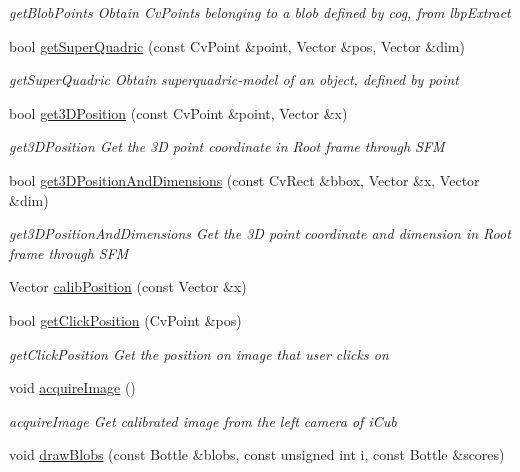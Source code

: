 \begin{DoxyCompactItemize}
\begin{DoxyCompactList}\small\item\em get\+Blob\+Points Obtain Cv\+Points belonging to a blob defined by cog, from lbp\+Extract \end{DoxyCompactList}\item 
bool \hyperlink{group__iol2opc_a6226f7de8cac860645608e45759f8d9a}{get\+Super\+Quadric} (const Cv\+Point \&point, Vector \&pos, Vector \&dim)
\begin{DoxyCompactList}\small\item\em get\+Super\+Quadric Obtain superquadric-\/model of an object, defined by point \end{DoxyCompactList}\item 
bool \hyperlink{group__iol2opc_af32fec2950ca87ee525c38168b02571b}{get3\+D\+Position} (const Cv\+Point \&point, Vector \&x)
\begin{DoxyCompactList}\small\item\em get3\+D\+Position Get the 3D point coordinate in Root frame through S\+FM \end{DoxyCompactList}\item 
bool \hyperlink{group__iol2opc_a6efd4c47885da925320b3d07deb5ec28}{get3\+D\+Position\+And\+Dimensions} (const Cv\+Rect \&bbox, Vector \&x, Vector \&dim)
\begin{DoxyCompactList}\small\item\em get3\+D\+Position\+And\+Dimensions Get the 3D point coordinate and dimension in Root frame through S\+FM \end{DoxyCompactList}\item 
Vector \hyperlink{group__iol2opc_a04b7cefdcd8c2ea856d348af2c07cb12}{calib\+Position} (const Vector \&x)
\item 
bool \hyperlink{group__iol2opc_aa0b5940b736070309d86fdaef957b2b9}{get\+Click\+Position} (Cv\+Point \&pos)
\begin{DoxyCompactList}\small\item\em get\+Click\+Position Get the position on image that user clicks on \end{DoxyCompactList}\item 
void \hyperlink{group__iol2opc_a798175bdeb57a13150a7d7d1ae9b1fd3}{acquire\+Image} ()
\begin{DoxyCompactList}\small\item\em acquire\+Image Get calibrated image from the left camera of i\+Cub \end{DoxyCompactList}\item 
void \hyperlink{group__iol2opc_a00146072817ea712a7fca1039707fe00}{draw\+Blobs} (const Bottle \&blobs, const unsigned int i, const Bottle \&scores)

\end{DoxyCompactItemize}
